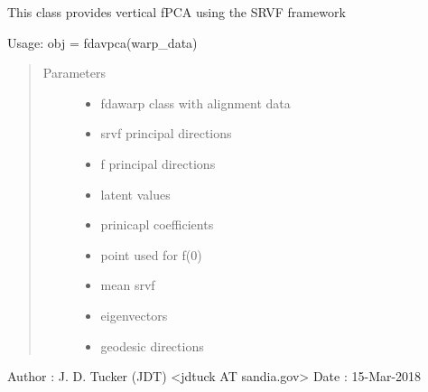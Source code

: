 \documentclass[letterpaper,10pt,english]{sphinxmanual}
\begin{document}
\begin{fulllineitems}
\label{\detokenize{fPCA:fPCA.fdavpca}}
This class provides vertical fPCA using the
SRVF framework

Usage:  obj = fdavpca(warp\_data)
\begin{quote}\begin{description}
\item[{Parameters}] \leavevmode\begin{itemize}
\item {} 
 \textendash{} fdawarp class with alignment data

\item {} 
 \textendash{} srvf principal directions

\item {} 
 \textendash{} f principal directions

\item {} 
 \textendash{} latent values

\item {} 
 \textendash{} prinicapl coefficients

\item {} 
 \textendash{} point used for f(0)

\item {} 
 \textendash{} mean srvf

\item {} 
 \textendash{} eigenvectors

\item {} 
 \textendash{} geodesic directions

\end{itemize}

\end{description}\end{quote}

Author :  J. D. Tucker (JDT) \textless{}jdtuck AT sandia.gov\textgreater{}
Date   :  15-Mar-2018


\end{fulllineitems}
\end{document}
